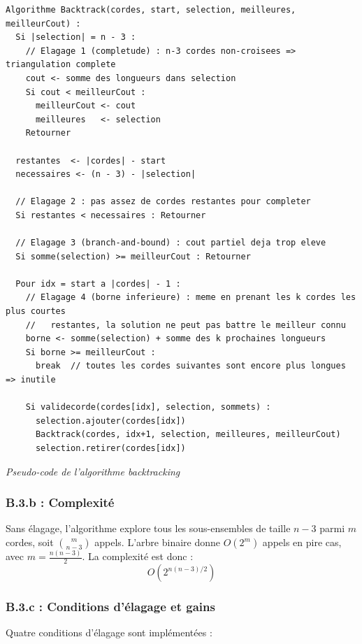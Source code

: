 \documentclass[12pt,a4paper]{article}
\begin{document}
\begin{lstlisting}[nolol, basicstyle=\ttfamily\footnotesize]
Algorithme Backtrack(cordes, start, selection, meilleures, meilleurCout) :
  Si |selection| = n - 3 :
    // Elagage 1 (completude) : n-3 cordes non-croisees => triangulation complete
    cout <- somme des longueurs dans selection
    Si cout < meilleurCout :
      meilleurCout <- cout
      meilleures   <- selection
    Retourner

  restantes  <- |cordes| - start
  necessaires <- (n - 3) - |selection|

  // Elagage 2 : pas assez de cordes restantes pour completer
  Si restantes < necessaires : Retourner

  // Elagage 3 (branch-and-bound) : cout partiel deja trop eleve
  Si somme(selection) >= meilleurCout : Retourner

  Pour idx = start a |cordes| - 1 :
    // Elagage 4 (borne inferieure) : meme en prenant les k cordes les plus courtes
    //   restantes, la solution ne peut pas battre le meilleur connu
    borne <- somme(selection) + somme des k prochaines longueurs
    Si borne >= meilleurCout :
      break  // toutes les cordes suivantes sont encore plus longues => inutile

    Si validecorde(cordes[idx], selection, sommets) :
      selection.ajouter(cordes[idx])
      Backtrack(cordes, idx+1, selection, meilleures, meilleurCout)
      selection.retirer(cordes[idx])
\end{lstlisting}
\begin{center}
{\small\itshape Pseudo-code de l'algorithme backtracking}
\end{center}

\subsubsection*{B.3.b : Complexité}

Sans élagage, l'algorithme explore tous les sous-ensembles de taille $n-3$ parmi $m$
cordes, soit $\binom{m}{n-3}$ appels. L'arbre binaire donne $O(2^m)$ appels en pire cas,
avec $m = \frac{n(n-3)}{2}$.  La complexité est donc :
\[
  O\!\left(2^{n(n-3)/2}\right)
\]

\subsubsection*{B.3.c : Conditions d'élagage et gains}

Quatre conditions d'élagage sont implémentées :
\end{document}
